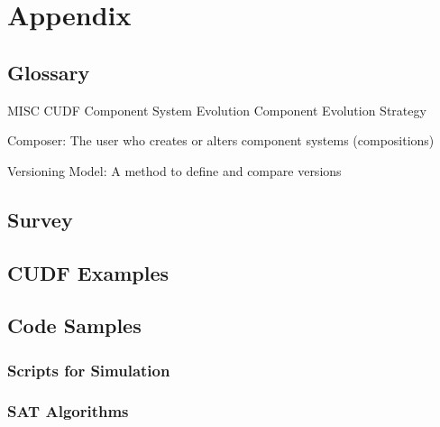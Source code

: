 \chapter{Appendix}

\section{Glossary}
MISC
CUDF
Component System Evolution
Component Evolution
Strategy


Composer: The user who creates or alters component systems (compositions)

Versioning Model: A method to define and compare versions

\section{Survey}
\label{survey}

\section{CUDF Examples}

\section{Code Samples}
\subsection{Scripts for Simulation}
\subsection{SAT Algorithms}
